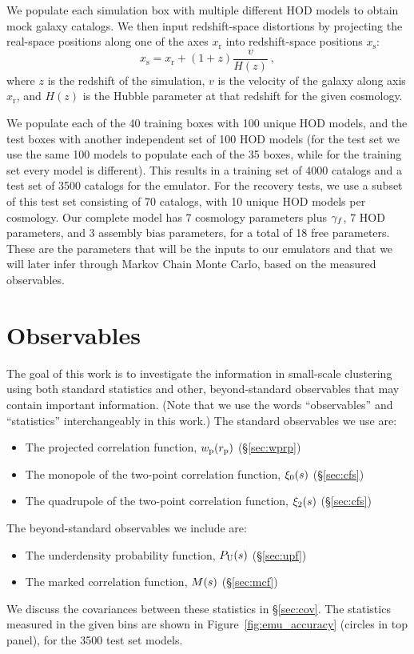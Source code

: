 We populate each simulation box with multiple different HOD models to obtain mock galaxy catalogs.
We then input redshift-space distortions by projecting the real-space positions along one of the axes $x_\mathrm{r}$ into redshift-space positions $x_\mathrm{s}$:
\begin{equation}
    x_\mathrm{s} = x_\mathrm{r} + (1+z)\frac{v}{H(z)} ~,
\end{equation}
where $z$ is the redshift of the simulation, $v$ is the velocity of the galaxy along axis $x_\mathrm{r}$, and $H(z)$ is the Hubble parameter at that redshift for the given cosmology.

We populate each of the 40 training boxes with 100 unique HOD models, and the test boxes with another independent set of 100 HOD models (for the test set we use the same 100 models to populate each of the 35 boxes, while for the training set every model is different).
This results in a training set of 4000 catalogs and a test set of 3500 catalogs for the emulator. 
For the recovery tests, we use a subset of this test set consisting of 70 catalogs, with 10 unique HOD models per cosmology.
Our complete model has 7 cosmology parameters plus $\gamma_f$, 7 HOD parameters, and 3 assembly bias parameters, for a total of 18 free parameters.
These are the parameters that will be the inputs to our emulators and that we will later infer through Markov Chain Monte Carlo, based on the measured observables.



\section{Observables}
\label{sec:observables}

The goal of this work is to investigate the information in small-scale clustering using both standard statistics and other, beyond-standard observables that may contain important information.
(Note that we use the words ``observables'' and ``statistics'' interchangeably in this work.)
The standard observables we use are:
\begin{itemize}
    \item The projected correlation function, $w_\mathrm{p}(r_\mathrm{p})$ (\S\ref{sec:wprp})
    \item The monopole of the two-point correlation function, $\xi_0(s)$ (\S\ref{sec:cfs})
    \item The quadrupole of the two-point correlation function, $\xi_2(s)$ (\S\ref{sec:cfs})
\end{itemize}
The beyond-standard observables we include are:
\begin{itemize}
    \item The underdensity probability function, $P_\mathrm{U}(s)$ (\S\ref{sec:upf})
    \item The marked correlation function, $M(s)$ (\S\ref{sec:mcf})
\end{itemize}
We discuss the covariances between these statistics in \S\ref{sec:cov}.
The statistics measured in the given bins are shown in Figure~\ref{fig:emu_accuracy} (circles in top panel), for the 3500 test set models.

